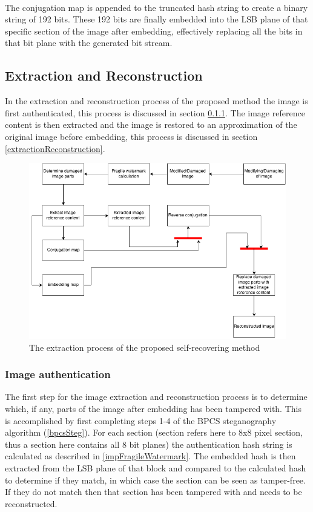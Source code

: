 \documentclass[12pt]{article}
\begin{document}
\hspace{0pt} \\
The conjugation map is appended to the truncated hash string to create a binary string of 192 bits.
These 192 bits are finally embedded into the LSB plane of that specific section of the image after embedding, effectively replacing all the bits in that bit plane with the generated bit stream.

\subsection{Extraction and Reconstruction}
\label{extractRestore}
In the extraction and reconstruction process of the proposed method the image is first authenticated, this process is discussed in section \ref{extractionAuthentication}. 
The image reference content is then extracted and the image is restored to an approximation of the original image before embedding, this process is discussed in section \ref{extractionReconstruction}.

\begin{figure}[h]
\centerline{%
\includegraphics[scale=0.6]{"ExtractionProcess"}%
} %
\caption{The extraction process of the proposed self-recovering method}
\label{fig:extractionProcess}
\end{figure} 

\subsubsection{Image authentication}
\label{extractionAuthentication}
The first step for the image extraction and reconstruction process is to determine which, if any, parts of the image after embedding has been tampered with.
This is accomplished by first completing steps 1-4 of the BPCS steganography algorithm (\ref{bpcsSteg}).
For each section (section refers here to 8x8 pixel section, thus a section here contains all 8 bit planes) the authentication hash string is calculated as described in \ref{impFragileWatermark}. 
The embedded hash is then extracted from the LSB plane of that block and compared to the calculated hash to determine if they match, in which case the section can be seen as tamper-free.
If they do not match then that section has been tampered with and needs to be reconstructed.
\end{document}
